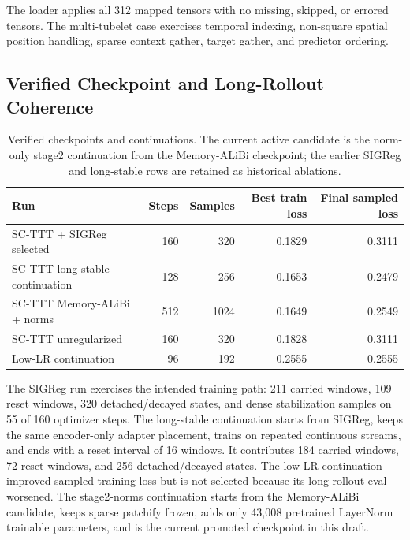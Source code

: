 \documentclass[10pt]{article}
\begin{document}
The loader applies all 312 mapped tensors with no missing, skipped, or errored
tensors.  The multi-tubelet case exercises temporal indexing, non-square
spatial position handling, sparse context gather, target gather, and predictor
ordering.

\subsection{Verified Checkpoint and Long-Rollout Coherence}

\begin{table}[t]
\centering
\caption{Verified checkpoints and continuations.  The current active candidate
is the norm-only stage2 continuation from the Memory-ALiBi checkpoint; the
earlier SIGReg and long-stable rows are retained as historical ablations.}
\label{tab:verified}
\begin{tabular}{lrrrr}
\toprule
Run & Steps & Samples & Best train loss & Final sampled loss \\
\midrule
SC-TTT + SIGReg selected & 160 & 320 & 0.1829 & 0.3111 \\
SC-TTT long-stable continuation & 128 & 256 & 0.1653 & 0.2479 \\
SC-TTT Memory-ALiBi + norms & 512 & 1024 & 0.1649 & 0.2549 \\
SC-TTT unregularized & 160 & 320 & 0.1828 & 0.3111 \\
Low-LR continuation & 96 & 192 & 0.2555 & 0.2555 \\
\bottomrule
\end{tabular}
\end{table}

The SIGReg run exercises the intended training path: 211 carried windows, 109
reset windows, 320 detached/decayed states, and dense stabilization samples on
55 of 160 optimizer steps.  The long-stable continuation starts from SIGReg,
keeps the same encoder-only adapter placement, trains on repeated continuous
streams, and ends with a reset interval of 16 windows.  It contributes 184
carried windows, 72 reset windows, and 256 detached/decayed states.  The low-LR
continuation improved sampled training loss but is not selected because its
long-rollout eval worsened.  The stage2-norms continuation starts from the
Memory-ALiBi candidate, keeps sparse patchify frozen, adds only 43,008
pretrained LayerNorm trainable parameters, and is the current promoted
checkpoint in this draft.
\end{document}

